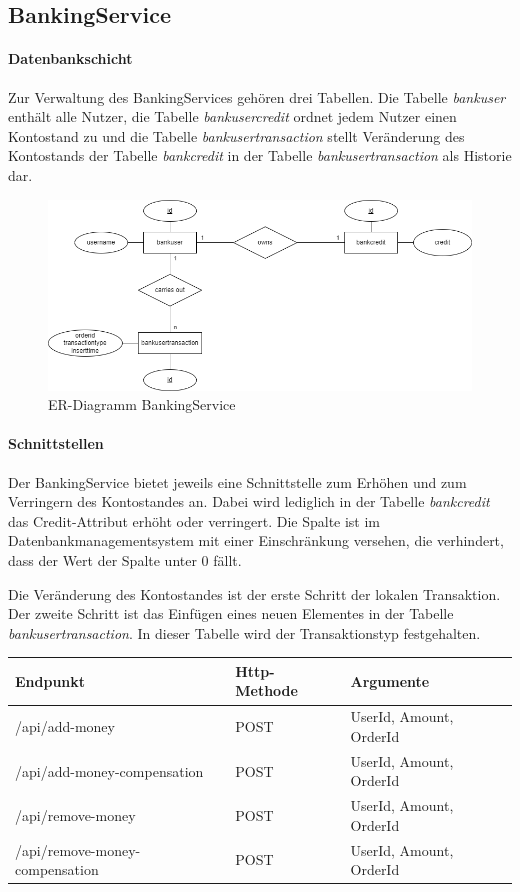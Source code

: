 \subsection{BankingService}
\paragraph*{Datenbankschicht} %
Zur Verwaltung des BankingServices gehören drei Tabellen. Die Tabelle \textit{bankuser} enthält alle Nutzer, die Tabelle \textit{bankusercredit} ordnet jedem Nutzer einen Kontostand zu und die Tabelle \textit{bankusertransaction} stellt Veränderung des Kontostands der Tabelle \textit{bankcredit} in der Tabelle \textit{bankusertransaction} als Historie dar.

\begin{figure}[h!]
	\centering
	\includegraphics[scale=0.5]{figures/DatabaseER/BankingServiceTables.png}
	\caption{ER-Diagramm BankingService}
\end{figure}
\FloatBarrier

\paragraph*{Schnittstellen}
Der BankingService bietet jeweils eine Schnittstelle zum Erhöhen und zum Verringern des Kontostandes an. Dabei wird lediglich in der Tabelle \textit{bankcredit} das Credit-Attribut erhöht oder verringert. Die Spalte ist im Datenbankmanagementsystem mit einer Einschränkung versehen, die verhindert, dass der Wert der Spalte unter 0 fällt. 

Die Veränderung des Kontostandes ist der erste Schritt der lokalen Transaktion. Der zweite Schritt ist das Einfügen eines neuen Elementes in der Tabelle \textit{bankusertransaction}. In dieser Tabelle wird der Transaktionstyp festgehalten. 

\begin{center}
	\begin{tabular}[h]{|l|l|l|}
		\hline
		Endpunkt & Http-Methode & Argumente \\ \hline
		/api/add-money & POST & UserId, Amount, OrderId \\ \hline
		/api/add-money-compensation & POST & UserId, Amount, OrderId \\ \hline
		/api/remove-money & POST & UserId, Amount, OrderId \\ \hline
		/api/remove-money-compensation & POST & UserId, Amount, OrderId \\ \hline 
	\end{tabular}
\end{center}
\FloatBarrier